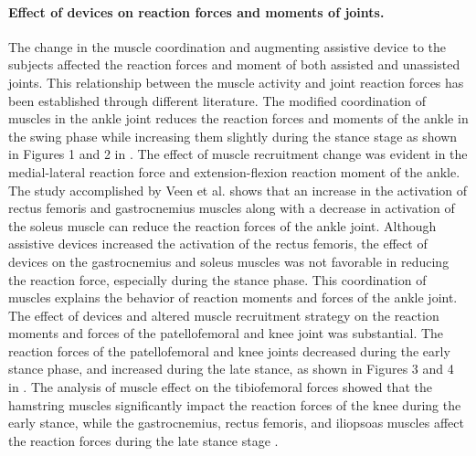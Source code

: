 \documentclass[10pt,letterpaper]{article}
\begin{document}
\paragraph*{Effect of devices on reaction forces and moments of joints.} The change in the muscle coordination and augmenting assistive device to the subjects affected the reaction forces and moment of both assisted and unassisted joints. This relationship between the muscle activity and joint reaction forces has been established through different literature\cite{171,170,173,174}. The modified coordination of muscles in the ankle joint reduces the reaction forces and moments of the ankle in the swing phase while increasing them slightly during the stance stage as shown in Figures 1 and 2 in . The effect of muscle recruitment change was evident in the medial-lateral reaction force and extension-flexion reaction moment of the ankle. The study accomplished by Veen et al. \cite{170} shows that an increase in the activation of rectus femoris and gastrocnemius muscles along with a decrease in activation of the soleus muscle can reduce the reaction forces of the ankle joint. Although assistive devices increased the activation of the rectus femoris, the effect of devices on the gastrocnemius and soleus muscles was not favorable in reducing the reaction force, especially during the stance phase. This coordination of muscles explains the behavior of reaction moments and forces of the ankle joint.\\
The effect of devices and altered muscle recruitment strategy on the reaction moments and forces of the patellofemoral and knee joint was substantial. The reaction forces of the patellofemoral and knee joints decreased during the early stance phase, and increased during the late stance, as shown in Figures 3 and 4 in . The analysis of muscle effect on the tibiofemoral forces showed that the hamstring muscles significantly impact the reaction forces of the knee during the early stance, while the gastrocnemius, rectus femoris, and iliopsoas muscles affect the reaction forces during the late stance stage \cite{171,170}.\\
\end{document}
